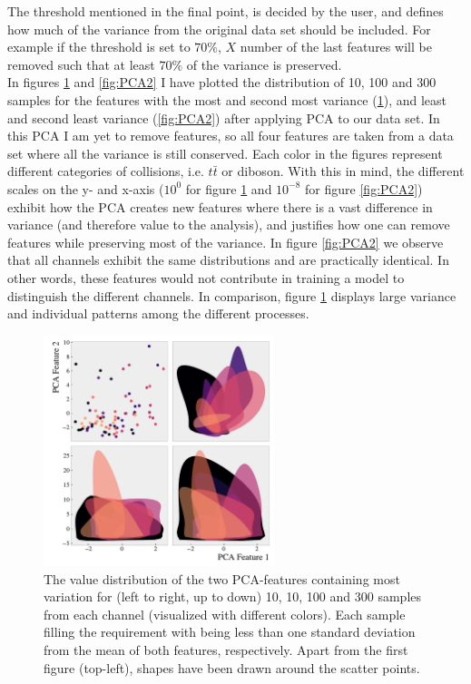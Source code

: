 The threshold mentioned in the final point, is decided by the user, and defines how much of the variance from the original data 
set should be included. For example if the threshold is set to $70\%$, $X$ number of the last features will be removed such 
that at least $70\%$ of the variance is preserved.
\\
In figures \ref{fig:PCA1} and \ref{fig:PCA2} I have plotted the distribution of 10, 100 and 300 samples 
for the features with the most and second most variance (\ref{fig:PCA1}), and least and second least 
variance (\ref{fig:PCA2}) after applying \ac{PCA} to our data set. In this \ac{PCA} I am yet to remove features, 
so all four features are taken from a data set where all the variance is still conserved. Each color in the figures 
represent different categories of collisions, i.e. $t\bar{t}$ or diboson. With this in 
mind, the different scales on the y- and x-axis ($10^0$ for figure \ref{fig:PCA1} and $10^{-8}$ for figure 
\ref{fig:PCA2}) exhibit how the \ac{PCA} creates new features where there is a vast difference in variance 
(and therefore value to the analysis), and justifies how one can remove features while preserving most of the variance. 
In figure \ref{fig:PCA2} we observe that all channels exhibit the same distributions and are practically identical. 
In other words, these features would not contribute in training a model to distinguish the different channels. 
In comparison, figure \ref{fig:PCA1} displays large variance and individual patterns among the different processes.
\begin{figure}
    \centering
    \includegraphics[width=0.6\textwidth]{Figures/MLResults/DataHandling/PCA/PCAPlotFirst.pdf}
    \caption[The value distribution of the two leading \acs{PCA}-features.]{The value distribution of 
    the two \ac{PCA}-features containing most variation for (left to right, up to down) 10, 10, 100 and 
    300 samples from each channel (visualized with different colors). Each sample filling the requirement with being less than one standard 
    deviation from the mean of both features, respectively. Apart from the first figure (top-left), shapes have been drawn around the scatter 
    points.}
    \label{fig:PCA1}
\end{figure}
